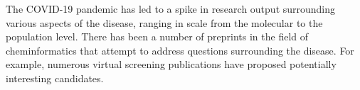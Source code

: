 \documentclass{bmcart}
\begin{document}








 







The COVID-19 pandemic has led to a spike in research output
surrounding various aspects of the disease, ranging in scale from the
molecular to the population level.  There has been a number of
preprints in the field of cheminformatics that attempt to address
questions surrounding the disease. For example, numerous virtual
screening publications have proposed potentially interesting
candidates.
\end{document}
